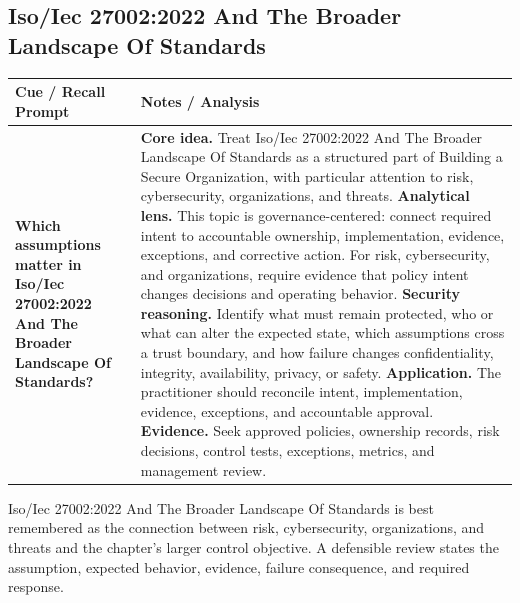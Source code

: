 \documentclass[11pt]{article}
\newcommand{\CornellHeader}{%
\rowcolor{Navy}\color{white}\bfseries Cue / Recall Prompt & \color{white}\bfseries Notes / Analysis\\\hline}
\newcommand{\CornellRow}[2]{%
\cellcolor{CueGray}\RaggedRight\textbf{#1} & \RaggedRight #2\\\hline}
\begin{document}
\subsection*{Iso/Iec 27002:2022 And The Broader Landscape Of Standards}
\begin{longtable}{>{\RaggedRight\arraybackslash}p{}|>{\RaggedRight\arraybackslash}p{}}
\CornellHeader
\CornellRow{Which assumptions matter in Iso/Iec 27002:2022 And The Broader Landscape Of Standards?}{\textbf{Core idea.} Treat Iso/Iec 27002:2022 And The Broader Landscape Of Standards as a structured part of Building a Secure Organization, with particular attention to risk, cybersecurity, organizations, and threats. \textbf{Analytical lens.} This topic is governance-centered: connect required intent to accountable ownership, implementation, evidence, exceptions, and corrective action. For risk, cybersecurity, and organizations, require evidence that policy intent changes decisions and operating behavior. \textbf{Security reasoning.} Identify what must remain protected, who or what can alter the expected state, which assumptions cross a trust boundary, and how failure changes confidentiality, integrity, availability, privacy, or safety. \textbf{Application.} The practitioner should reconcile intent, implementation, evidence, exceptions, and accountable approval. \textbf{Evidence.} Seek approved policies, ownership records, risk decisions, control tests, exceptions, metrics, and management review.}
\end{longtable}
\begin{topicsummary}
Iso/Iec 27002:2022 And The Broader Landscape Of Standards is best remembered as the connection between risk, cybersecurity, organizations, and threats and the chapter's larger control objective. A defensible review states the assumption, expected behavior, evidence, failure consequence, and required response.
\end{topicsummary}
\end{document}
